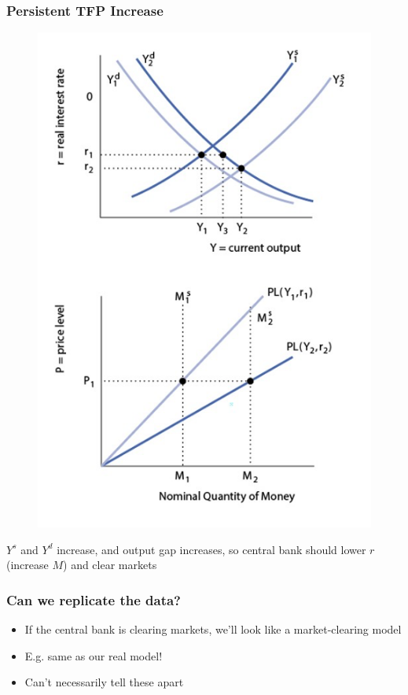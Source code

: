 \documentclass{beamer}
\begin{document}
\begin{frame}
\frametitle[alignment=center]{Persistent TFP Increase}
\begin{figure}
\centering
\includegraphics[scale=0.65]{Figures/W_Fig_14pt5.png}
\end{figure}
$Y^s$ and $Y^d$ increase, and output gap increases, so central bank should lower $r$ (increase $M$) and clear markets
\end{frame}

\begin{frame}
\frametitle[alignment=center]{Can we replicate the data? }
\begin{itemize}
\item If the central bank is clearing markets, we'll look like a market-clearing model
\bigskip
\item E.g. same as our real model!
\bigskip
\item Can't necessarily tell these apart
\end{itemize}
\end{frame}
\end{document}
